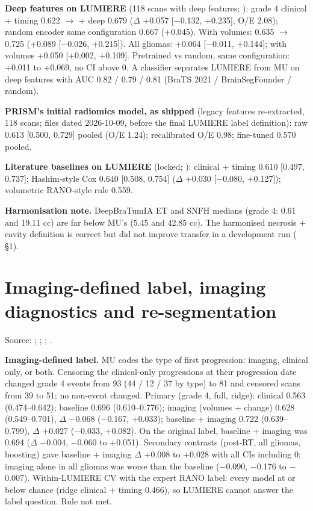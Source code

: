 \documentclass[11pt,a4paper]{article}
\begin{document}
\textbf{Deep features on LUMIERE} (118 scans with deep features;
): grade 4
clinical + timing 0.622 $\rightarrow$ + deep 0.679 ($\Delta$ +0.057 [$-$0.132, +0.235], O/E 2.08); random
encoder same configuration 0.667 (+0.045). With volumes: 0.635 $\rightarrow$ 0.725 (+0.089 [$-$0.026,
+0.215]). All gliomas: +0.064 [$-$0.011, +0.144]; with volumes +0.050 [+0.002, +0.109]. Pretrained vs random,
same configuration: +0.011 to +0.069, no CI above 0. A classifier separates LUMIERE from MU on deep features
with AUC 0.82 / 0.79 / 0.81 (BraTS 2021 / BrainSegFounder / random).

\textbf{PRISM's initial radiomics model, as shipped} (legacy features re-extracted, 118 scans; files dated 2026-10-09, before
the final LUMIERE label definition): raw 0.613 [0.500, 0.729] pooled (O/E 1.24); recalibrated O/E 0.98;
fine-tuned 0.570 pooled.

\textbf{Literature baselines on LUMIERE} (locked; ): clinical + timing 0.610 [0.497,
0.737]; Hashim-style Cox 0.640 [0.508, 0.754] ($\Delta$ +0.030 [$-$0.080, +0.127]); volumetric RANO-style rule
0.559.

\textbf{Harmonisation note.} DeepBraTumIA ET and SNFH medians (grade 4: 0.61 and 19.11 cc) are far below MU's
(5.45 and 42.85 cc). The harmonised necrosis + cavity definition is correct but did not improve transfer in a
development run ( \S{}1).

\FloatBarrier
\section{Imaging-defined label, imaging diagnostics and re-segmentation}\label{sec:S14}

Source: ;
;
;
.

\textbf{Imaging-defined label.} MU codes the type of first progression: imaging, clinical only, or both.
Censoring the clinical-only progressions at their progression date changed grade 4 events from 93 (44 / 12 /
37 by type) to 81 and censored scans from 39 to 51; no non-event changed. Primary (grade 4, full, ridge):
clinical 0.563 (0.474--0.642); baseline 0.696 (0.610--0.776); imaging (volumes + change) 0.628 (0.549--0.701),
$\Delta$ $-$0.068 ($-$0.167, +0.033); baseline + imaging 0.722 (0.639--0.799), $\Delta$ +0.027 ($-$0.033,
+0.082). On the original label, baseline + imaging was 0.694 ($\Delta$ $-$0.004, $-$0.060 to +0.051).
Secondary contrasts (post-RT, all gliomas, boosting) gave baseline + imaging $\Delta$ +0.008 to +0.028 with
all CIs including 0; imaging alone in all gliomas was worse than the baseline ($-$0.090, $-$0.176 to
$-$0.007). Within-LUMIERE CV with the expert RANO label: every model at or below chance (ridge clinical +
timing 0.466), so LUMIERE cannot answer the label question. Rule not met.
\end{document}
